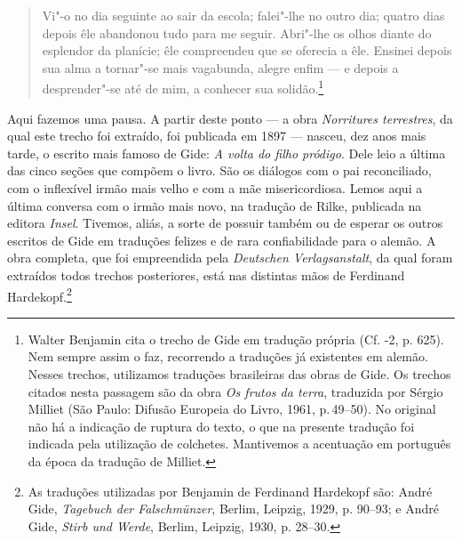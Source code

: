 \begin{quote}
Vi"-o no dia seguinte ao sair da escola; falei"-lhe no outro dia; quatro
dias depois êle abandonou tudo para me seguir. Abri"-lhe os olhos diante
do esplendor da planície; êle compreendeu que se oferecia a êle. Ensinei
depois sua alma a tornar"-se mais vagabunda, alegre enfim --- e depois a
desprender"-se até de mim, a conhecer sua solidão.\footnote{Walter Benjamin cita o trecho de Gide em tradução própria (Cf. -2, p. 625). Nem sempre assim o faz, recorrendo a traduções já
  existentes em alemão. Nesses trechos, utilizamos traduções brasileiras
  das obras de Gide. Os trechos citados nesta passagem são da obra
  \emph{Os frutos da terra}, traduzida por Sérgio Milliet (São Paulo:
  Difusão Europeia do Livro, 1961, p.\,49--50). No original não há a
  indicação de ruptura do texto, o que na presente tradução foi indicada
  pela utilização de colchetes. Mantivemos a acentuação em português da
  época da tradução de Milliet. \versal{[N.~T.]}}
  \end{quote}

Aqui fazemos uma pausa. A partir deste ponto --- a obra \emph{Norritures
terrestres}, da qual este trecho foi extraído, foi publicada em 1897 ---
nasceu, dez anos mais tarde, o escrito mais famoso de Gide: \emph{A
volta do filho pródigo}. Dele leio a última das cinco seções que compõem
o livro. São os diálogos com o pai reconciliado, com o inflexível irmão
mais velho e com a mãe misericordiosa. Lemos aqui a última
conversa com o irmão mais novo, na tradução de Rilke, publicada na
editora \emph{Insel}. Tivemos, aliás, a sorte de possuir também ou de
esperar os outros escritos de Gide em traduções felizes e de rara
confiabilidade para o alemão. A obra completa, que foi empreendida pela
\emph{Deutschen Verlagsanstalt}, da qual foram extraídos todos trechos
posteriores, está nas distintas mãos de Ferdinand Hardekopf.\footnote{As traduções utilizadas por Benjamin de Ferdinand Hardekopf são: André Gide,
  \emph{Tagebuch der Falschmünzer}, Berlim, Leipzig, 1929, p. 90--93; e
  André Gide, \emph{Stirb und Werde}, Berlim, Leipzig, 1930, p. 28--30. \versal{[N.~T.]}}

